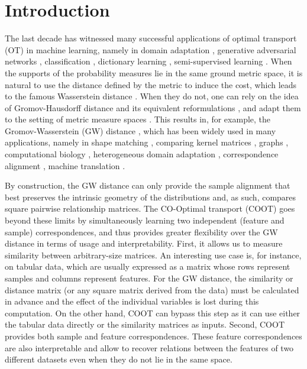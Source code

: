 \section{Introduction}

The last decade has witnessed many successful applications of optimal
transport (OT) \citep{Monge81,Kanto42} in machine learning, namely in domain adaptation \citep{Courty16},
generative adversarial networks \citep{Arjovsky17}, classification \citep{Frogner15},
dictionary learning \citep{Rolet16}, semi-supervised learning \citep{Solomon14}. When the
supports of the probability measures lie in the same ground metric space, it is natural to use the distance defined by the metric
to induce the cost, which leads to the famous Wasserstein distance \citep{Villani03}. When they do not, one can rely on the idea of Gromov-Hausdorff distance \citep{Gromov81} and its equivalent reformulations \citep{Gromov99,Kalton99,Burago01}, and adapt them to the setting of metric measure spaces \citep{Gromov99}. This results in, for example, the Gromov-Wasserstein
(GW) distance \citep{Memoli07,Memoli11,Sturm12}, which has been widely used in many applications, namely in shape matching \citep{Memoli11},
comparing kernel matrices \citep{Peyre16}, graphs \citep{Vayer19b,Xu19,Xu19b},
computational biology \citep{Demetci22}, heterogeneous domain adaptation \citep{Yan18},
correspondence alignment \citep{Solomon16}, machine translation \citep{Melis18}.

By construction, the GW distance can only provide the sample alignment that best preserves the intrinsic geometry of the distributions and, as such, compares square pairwise relationship matrices. The CO-Optimal transport (COOT) \citep{Redko20,Chowdhury21b} goes beyond these limits by simultaneously learning two independent (feature and sample) correspondences, and thus provides greater flexibility over the GW distance in terms of usage and interpretability. First, it allows us to measure similarity between arbitrary-size matrices. An interesting use case is, for instance, on tabular data, which are usually expressed as a matrix whose rows represent samples and columns represent features. For the GW distance,
the similarity or distance matrix (or any square matrix derived from the data)
must be calculated in advance and the effect of the individual variables is lost during this computation. On the other hand, COOT can bypass this step as it can use either the tabular data directly or the similarity matrices as inputs. Second, COOT provides both sample and feature correspondences. These feature correspondences are also interpretable and allow to recover relations between the features of two different datasets even when they do not lie in the same space.

